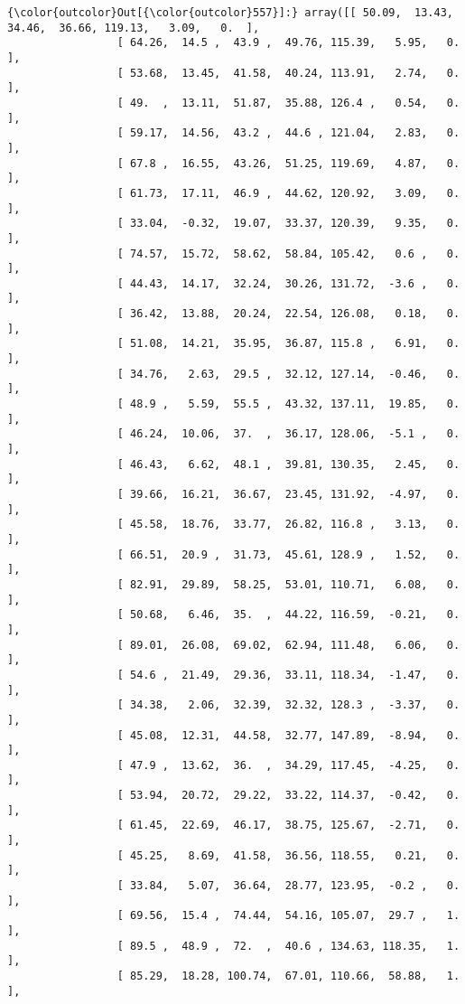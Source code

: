 \documentclass[11pt]{article}
\begin{document}
\begin{Verbatim}[commandchars=\\\{\}]
{\color{outcolor}Out[{\color{outcolor}557}]:} array([[ 50.09,  13.43,  34.46,  36.66, 119.13,   3.09,   0.  ],
                 [ 64.26,  14.5 ,  43.9 ,  49.76, 115.39,   5.95,   0.  ],
                 [ 53.68,  13.45,  41.58,  40.24, 113.91,   2.74,   0.  ],
                 [ 49.  ,  13.11,  51.87,  35.88, 126.4 ,   0.54,   0.  ],
                 [ 59.17,  14.56,  43.2 ,  44.6 , 121.04,   2.83,   0.  ],
                 [ 67.8 ,  16.55,  43.26,  51.25, 119.69,   4.87,   0.  ],
                 [ 61.73,  17.11,  46.9 ,  44.62, 120.92,   3.09,   0.  ],
                 [ 33.04,  -0.32,  19.07,  33.37, 120.39,   9.35,   0.  ],
                 [ 74.57,  15.72,  58.62,  58.84, 105.42,   0.6 ,   0.  ],
                 [ 44.43,  14.17,  32.24,  30.26, 131.72,  -3.6 ,   0.  ],
                 [ 36.42,  13.88,  20.24,  22.54, 126.08,   0.18,   0.  ],
                 [ 51.08,  14.21,  35.95,  36.87, 115.8 ,   6.91,   0.  ],
                 [ 34.76,   2.63,  29.5 ,  32.12, 127.14,  -0.46,   0.  ],
                 [ 48.9 ,   5.59,  55.5 ,  43.32, 137.11,  19.85,   0.  ],
                 [ 46.24,  10.06,  37.  ,  36.17, 128.06,  -5.1 ,   0.  ],
                 [ 46.43,   6.62,  48.1 ,  39.81, 130.35,   2.45,   0.  ],
                 [ 39.66,  16.21,  36.67,  23.45, 131.92,  -4.97,   0.  ],
                 [ 45.58,  18.76,  33.77,  26.82, 116.8 ,   3.13,   0.  ],
                 [ 66.51,  20.9 ,  31.73,  45.61, 128.9 ,   1.52,   0.  ],
                 [ 82.91,  29.89,  58.25,  53.01, 110.71,   6.08,   0.  ],
                 [ 50.68,   6.46,  35.  ,  44.22, 116.59,  -0.21,   0.  ],
                 [ 89.01,  26.08,  69.02,  62.94, 111.48,   6.06,   0.  ],
                 [ 54.6 ,  21.49,  29.36,  33.11, 118.34,  -1.47,   0.  ],
                 [ 34.38,   2.06,  32.39,  32.32, 128.3 ,  -3.37,   0.  ],
                 [ 45.08,  12.31,  44.58,  32.77, 147.89,  -8.94,   0.  ],
                 [ 47.9 ,  13.62,  36.  ,  34.29, 117.45,  -4.25,   0.  ],
                 [ 53.94,  20.72,  29.22,  33.22, 114.37,  -0.42,   0.  ],
                 [ 61.45,  22.69,  46.17,  38.75, 125.67,  -2.71,   0.  ],
                 [ 45.25,   8.69,  41.58,  36.56, 118.55,   0.21,   0.  ],
                 [ 33.84,   5.07,  36.64,  28.77, 123.95,  -0.2 ,   0.  ],
                 [ 69.56,  15.4 ,  74.44,  54.16, 105.07,  29.7 ,   1.  ],
                 [ 89.5 ,  48.9 ,  72.  ,  40.6 , 134.63, 118.35,   1.  ],
                 [ 85.29,  18.28, 100.74,  67.01, 110.66,  58.88,   1.  ],

\end{Verbatim}
\end{document}
